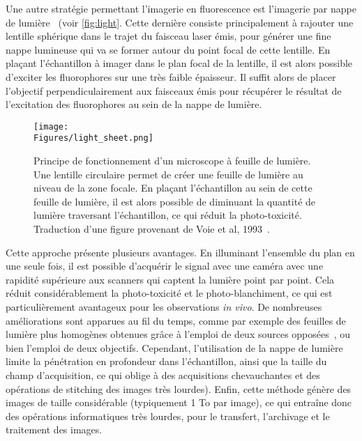 \documentclass[\main/main.tex]{subfiles}
\begin{document}
\label{sec:spim}
Une autre stratégie permettant l'imagerie en fluorescence est l'imagerie par nappe de lumière~\cite{voie_1993} (voir \autoref{fig:light}. Cette dernière consiste principalement à rajouter une lentille sphérique dans le trajet du faisceau laser émis, pour générer une fine nappe lumineuse qui va se former autour du point focal de cette lentille.
%
En plaçant l'échantillon à imager dans le plan focal de la lentille,
il est alors possible d'exciter les fluorophores sur une très faible épaisseur.
%
Il suffit alors de placer l'objectif perpendiculairement aux faisceaux émis pour récupérer le résultat de l'excitation des fluorophores au sein de la nappe de lumière.

\begin{figure}[h!]{\textwidth} 
    \centering
       \centering \texttt{[image: \\Figures/light\_sheet.png]}
       \caption{
            \label{fig:light}
            Principe de fonctionnement d'un microscope à feuille de lumière.
            \newline
            Une lentille circulaire permet de créer une feuille de lumière au niveau de la zone focale.
            En plaçant l'échantillon au sein de cette feuille de lumière, il est alors possible de diminuant la quantité de lumière traversant l'échantillon, ce qui réduit la photo\hyp{}toxicité. 
            \newline
            Traduction d'une figure provenant de Voie et al, 1993~\cite{voie_1993}.
            }
\end{figure}

Cette approche présente plusieurs avantages. En illuminant l'ensemble du plan en une seule fois, il est possible d'acquérir le signal avec une caméra avec une rapidité supérieure aux scanners qui captent la lumière point par point.
Cela réduit considérablement la photo-toxicité et le photo\hyp{}blanchiment, ce qui est particulièrement avantageux pour les observations  \textit{in vivo}.
%
De nombreuses améliorations sont apparues au fil du temps, comme par exemple des feuilles de lumière plus homogènes obtenues grâce à l'emploi de deux sources opposées~\cite{huisken_2007}, ou bien l'emploi de deux objectifs.
%
Cependant, l'utilisation de la nappe de lumière limite la pénétration en profondeur dans l'échantillon, ainsi que la taille du champ d'acquisition, ce qui oblige à des acquisitions chevauchantes et des opérations de stitching des images très lourdes). Enfin, cette méthode génère des images de taille considérable (typiquement 1 To par image), ce qui entraîne donc des opérations informatiques très lourdes, pour le transfert, l'archivage et le traitement des images.
\end{document}
